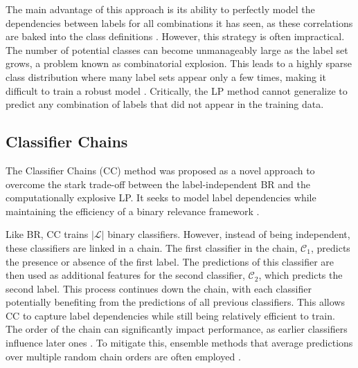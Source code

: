 The main advantage of this approach is its ability to perfectly model the dependencies between labels for all combinations it has seen, as these correlations are baked into the class definitions \cite{Sucar2014Multi-label}. However, this strategy is often impractical. The number of potential classes can become unmanageably large as the label set grows, a problem known as combinatorial explosion. This leads to a highly sparse class distribution where many label sets appear only a few times, making it difficult to train a robust model \cite{Cherman2011}. Critically, the LP method cannot generalize to predict any combination of labels that did not appear in the training data.

\subsection{Classifier Chains}
The Classifier Chains (CC) method was proposed as a novel approach to overcome the stark trade-off between the label-independent BR and the computationally explosive LP. It seeks to model label dependencies while maintaining the efficiency of a binary relevance framework \cite{Read2011}.

Like BR, CC trains $|\mathcal{L}|$ binary classifiers. However, instead of being independent, these classifiers are linked in a chain. The first classifier in the chain, $\mathcal{C}_1$, predicts the presence or absence of the first label. The predictions of this classifier are then used as additional features for the second classifier, $\mathcal{C}_2$, which predicts the second label. This process continues down the chain, with each classifier potentially benefiting from the predictions of all previous classifiers. This allows CC to capture label dependencies while still being relatively efficient to train. \cite{Read2011} The order of the chain can significantly impact performance, as earlier classifiers influence later ones \cite{Read2021}. To mitigate this, ensemble methods that average predictions over multiple random chain orders are often employed \cite{Sucar2014Multi-label,Zhang2018}.

